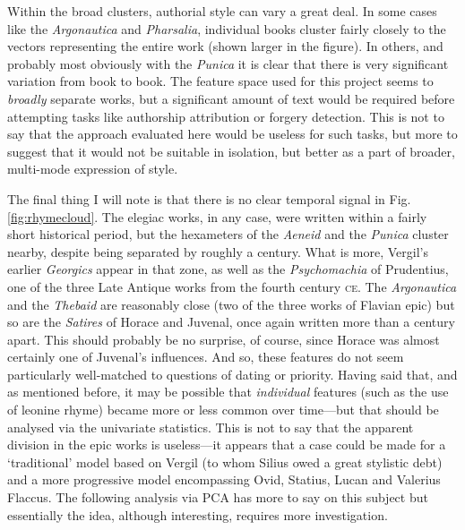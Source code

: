 \documentclass[twocolumn, switch, a4paper]{article} %
\begin{document}
Within the broad clusters, authorial style can vary a great deal. In some
cases like the \emph{Argonautica} and \emph{Pharsalia}, individual books
cluster fairly closely to the vectors representing the entire work (shown
larger in the figure). In others, and probably most obviously with the
\emph{Punica} it is clear that there is very significant variation from book
to book. The feature space used for this project seems to \emph{broadly}
separate works, but a significant amount of text would be required before
attempting tasks like authorship attribution or forgery detection. This is not
to say that the approach evaluated here would be useless for such tasks, but
more to suggest that it would not be suitable in isolation, but better as a
part of broader, multi-mode expression of style.

The final thing I will note is that there is no clear temporal signal in Fig.
\ref{fig:rhymecloud}. The elegiac works, in any case, were written within a
fairly short historical period, but the hexameters of the \emph{Aeneid} and
the \emph{Punica} cluster nearby, despite being separated by roughly a
century. What is more, Vergil's earlier \emph{Georgics} appear in that zone,
as well as the \emph{Psychomachia} of Prudentius, one of the three Late
Antique works from the fourth century \textsc{ce}. The \emph{Argonautica} and the
\emph{Thebaid} are reasonably close (two of the three works of Flavian epic)
but so are the \emph{Satires} of Horace and Juvenal, once again written more
than a century apart. This should probably be no surprise, of course, since
Horace was almost certainly one of Juvenal's influences. And so, these
features do not seem particularly well-matched to questions of dating or
priority. Having said that, and as mentioned before, it may be possible that
\emph{individual} features (such as the use of leonine rhyme) became more or
less common over time---but that should be analysed via the univariate
statistics. This is not to say that the apparent division in the epic works is
useless---it appears that a case could be made for a `traditional' model based
on Vergil (to whom Silius owed a great stylistic debt) and a more progressive
model encompassing Ovid, Statius, Lucan and Valerius Flaccus. The following
analysis via PCA has more to say on this subject but essentially the idea,
although interesting, requires more investigation.
\end{document}
